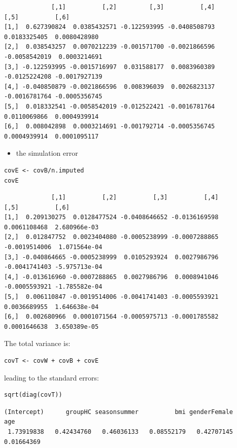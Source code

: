 \documentclass[12pt]{article}
\begin{document}
\begin{verbatim}
             [,1]          [,2]         [,3]          [,4]          [,5]          [,6]
[1,]  0.627390824  0.0385432571 -0.122593995 -0.0408508793  0.0183325405  0.0080428980
[2,]  0.038543257  0.0070212239 -0.001571700 -0.0021866596 -0.0058542019  0.0003214691
[3,] -0.122593995 -0.0015716997  0.031588177  0.0083960389 -0.0125224208 -0.0017927139
[4,] -0.040850879 -0.0021866596  0.008396039  0.0026823137 -0.0016781764 -0.0005356745
[5,]  0.018332541 -0.0058542019 -0.012522421 -0.0016781764  0.0110069866  0.0004939914
[6,]  0.008042898  0.0003214691 -0.001792714 -0.0005356745  0.0004939914  0.0001095117
\end{verbatim}

\begin{itemize}
\item the simulation error
\end{itemize}
\lstset{language=r,label= ,caption= ,captionpos=b,numbers=none}
\begin{lstlisting}
covE <- covB/n.imputed
covE
\end{lstlisting}

\begin{verbatim}
             [,1]          [,2]          [,3]          [,4]          [,5]          [,6]
[1,]  0.209130275  0.0128477524 -0.0408646652 -0.0136169598  0.0061108468  2.680966e-03
[2,]  0.012847752  0.0023404080 -0.0005238999 -0.0007288865 -0.0019514006  1.071564e-04
[3,] -0.040864665 -0.0005238999  0.0105293924  0.0027986796 -0.0041741403 -5.975713e-04
[4,] -0.013616960 -0.0007288865  0.0027986796  0.0008941046 -0.0005593921 -1.785582e-04
[5,]  0.006110847 -0.0019514006 -0.0041741403 -0.0005593921  0.0036689955  1.646638e-04
[6,]  0.002680966  0.0001071564 -0.0005975713 -0.0001785582  0.0001646638  3.650389e-05
\end{verbatim}

The total variance is:
\lstset{language=r,label= ,caption= ,captionpos=b,numbers=none}
\begin{lstlisting}
covT <- covW + covB + covE
\end{lstlisting}

leading to the standard errors:
\lstset{language=r,label= ,caption= ,captionpos=b,numbers=none}
\begin{lstlisting}
sqrt(diag(covT))
\end{lstlisting}
\begin{verbatim}
(Intercept)      groupHC seasonsummer          bmi genderFemale          age 
 1.73919838   0.42434760   0.46036133   0.08552179   0.42707145   0.01664369
\end{verbatim}
\end{document}
